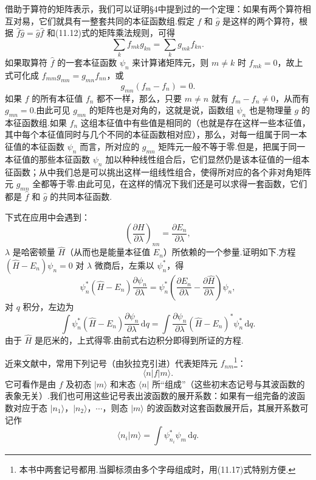 借助于算符的矩阵表示，我们可以证明§4中提到过的一个定理：如果有两个算符相互对易，它们就具有一整套共同的本征函数组.假定 $\hat{f}$ 和 $\hat{g}$ 是这样的两个算符，根据 $\hat{f}\hat{g}=\hat{g}\hat{f}$ 和(11.12)式的矩阵乘法规则，可得
\begin{equation*}
  \sum_kf_{mk}g_{kn}=\sum_kg_{mk}f_{kn}.
\end{equation*}
如果取算符 $\hat{f}$ 的一套本征函数 $\psi_n$ 来计算诸矩阵元，则 $m\neq k$ 时 $f_{mk}=0$，故上式可化成 $f_{mm}g_{mn}=g_{mn}f_{nn}$，或
\begin{equation*}
  g_{mn}(f_m-f_n)=0.
\end{equation*}
如果 $f$ 的所有本征值 $f_n$ 都不一样，那么，只要 $m\neq n$ 就有 $f_m-f_n\neq0$，从而有 $g_{mn}=0$.由此可见 $g_{mn}$ 的矩阵也是对角的，这就是说，函数组 $\psi_n$ 也是物理量 $g$ 的本征函数组.如果 $f_n$ 这组本征值中有些值是相同的（也就是存在这样一些本征值，其中每个本征值同时与几个不同的本征函数相对应），那么，对每一组属于同一本征值的本征函数 $\psi_n$ 而言，所对应的 $g_{mn}$ 矩阵元一般不等于零.但是，把属于同一本征值的那些本征函数 $\psi_n$ 加以种种线性组合后，它们显然仍是该本征值的一组本征函数；从中我们总是可以挑出这样一组线性组合，使得所对应的各个非对角矩阵元 $g_{mn}$ 全都等于零.由此可见，在这样的情况下我们还是可以求得一套函数，它们都是 $\hat{f}$ 和 $\hat{g}$ 的共同本征函数.

下式在应用中会遇到：
\begin{equation}
  \left(\frac{\partial H}{\partial\lambda}\right)_{nn}
  =\frac{\partial E_n}{\partial\lambda},
\end{equation}
$\lambda$ 是哈密顿量 $\hat{H}$（从而也是能量本征值 $E_n$）所依赖的一个参量.证明如下.方程 $(\hat{H}-E_n)\psi_n=0$ 对 $\lambda$ 微商后，左乘以 $\psi_n^{*}$，得
\begin{equation*}
  \psi_n^{*}(\hat{H}-E_n)\frac{\partial\psi_n}{\partial\lambda}
  =\psi_n^{*}\left(\frac{\partial E_n}{\partial\lambda}
  -\frac{\partial\hat{H}}{\partial\lambda}\right)\psi_n,
\end{equation*}
对 $q$ 积分，左边为
\begin{equation*}
  \int\psi_n^{*}(\hat{H}-E_n)\frac{\partial\psi_n}{\partial\lambda}\,\mathrm{d}q
  =\int\frac{\partial\psi_n}{\partial\lambda}
  (\hat{H}-E_n)^{*}\psi_n^{*}\,\mathrm{d}q.
\end{equation*}
由于 $\hat{H}$ 是厄米的，上式得零.由前式右边积分即得到所证的方程.

近来文献中，常用下列记号（由狄拉克引进）代表矩阵元 $f_{nm}$\footnote{本书中两套记号都用.当脚标须由多个字母组成时，用(11.17)式特别方便.}：
\begin{equation}
  \langle n|f|m\rangle.
\end{equation}
它可看作是由 $f$ 及初态 $|m\rangle$ 和末态 $\langle n|$ 所“组成”（这些初末态记号与其波函数的表象无关）.我们也可用这些记号表出波函数的展开系数：如果有一组完备的波函数对应于态 $|n_1\rangle$，$|n_2\rangle$，$\cdots$，则态 $|m\rangle$ 的波函数对这套函数展开后，其展开系数可记作
\begin{equation}
  \langle n_i|m\rangle=\int\psi_{n_i}^{*}\psi_m\,\mathrm{d}q.
\end{equation}

